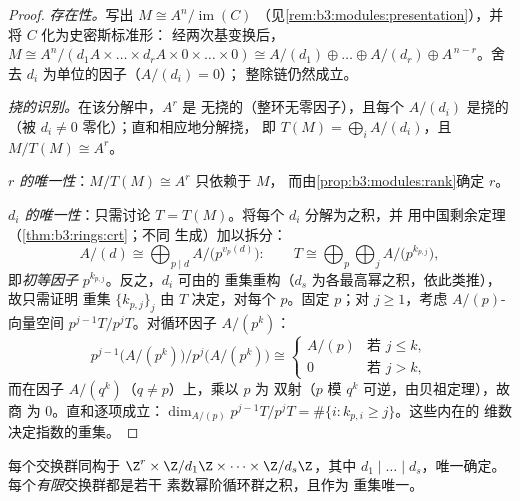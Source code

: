 \begin{proof}
\emph{存在性。}写出 $M \cong A^n/\operatorname{im}(C)$
（见\cref{rem:b3:modules:presentation}），并将 $C$ 化为史密斯标准形：
经两次基变换后，$M \cong A^n / (d_1A \times \dots
\times d_rA \times 0 \times \dots \times 0) \cong A/(d_1) \oplus
\dots \oplus A/(d_r) \oplus A^{\,n - r}$。舍去
$d_i$ 为单位的因子（$A/(d_i) = 0$）；
整除链仍然成立。

\emph{挠的识别。}在该分解中，$A^r$ 是
无挠的（整环无零因子），且每个 $A/(d_i)$
是挠的（被 $d_i \ne 0$ 零化）；直和相应地分解挠，
即 $T(M) = \bigoplus_i A/(d_i)$，且 $M/T(M) \cong A^r$。

\emph{$r$ 的唯一性}：$M/T(M) \cong A^r$ 只依赖于 $M$，
而由\cref{prop:b3:modules:rank}确定 $r$。

\emph{$d_i$ 的唯一性}：只需讨论
$T = T(M)$。将每个 $d_i$ 分解为之积，并
用中国剩余定理（\cref{thm:b3:rings:crt}；不同
生成）加以拆分：
\[
A/(d) \cong \bigoplus_{p \mid d} A/\bigl(p^{v_p(d)}\bigr):
\qquad
T \cong \bigoplus_{p} \bigoplus_{j} A/\bigl(p^{k_{p,j}}\bigr),
\]
即\emph{初等因子}
$p^{k_{p,j}}$。反之，$d_i$ 可由的
重集重构（$d_s$ 为各最高幂之积，依此类推），
故只需证明
重集 $\{k_{p,j}\}_j$ 由 $T$ 决定，对每个
$p$。固定 $p$；对 $j \geq 1$，考虑 $A/(p)$-向量空间
$p^{j-1}T/p^jT$。对循环因子 $A/(p^k)$：
\[
p^{j-1}\bigl(A/(p^k)\bigr)\big/p^{j}\bigl(A/(p^k)\bigr)
\cong
\begin{cases}
A/(p) & \text{若 } j \leq k,\\
0 & \text{若 } j > k,
\end{cases}
\]
而在因子 $A/(q^k)$（$q \neq p$）上，乘以 $p$ 为
双射（$p$ 模 $q^k$ 可逆，由贝祖定理），故商
为 $0$。直和逐项成立：$\dim_{A/(p)}
p^{j-1}T/p^jT = \#\{i : k_{p,i} \geq j\}$。这些内在的
维数决定指数的重集。
\end{proof}

\begin{corollary}[有限生成交换群]
\label{cor:b3:modules:abelian}
每个交换群同构于 $\Z^r \times
\Z/d_1\Z\times\dots\times\Z/d_s\Z$，其中 $d_1 \mid \dots \mid
d_s$，唯一确定。每个\emph{有限}交换群都是若干
素数幂阶循环群之积，且作为
重集唯一。
\end{corollary}

